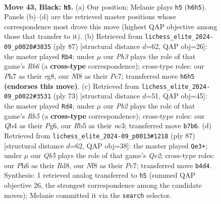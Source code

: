 \documentclass[11pt]{article}
\begin{document}
\clearpage

\begin{figure}[p]\centering
\begin{subfigure}{0.46\textwidth}\centering
\resizebox{\linewidth}{!}{%
\newchessgame
\chessboard[
  setfen={R4n1k/1pQ4p/7p/1r6/1q6/6NK/8/7R b - - 4 43},
  showmover=false,
  pgfstyle=straightmove, color=movearrow, markmove={h6-h5}
]}
\caption{}
\end{subfigure}\hfill
\begin{subfigure}{0.46\textwidth}\centering
\resizebox{\linewidth}{!}{%
\newchessgame
\chessboard[
  setfen={6R1/1kpQ4/8/p1q1pN2/4P3/1r6/6PK/8 b - - 14 44},
  showmover=false,
  pgfstyle=straightmove, color=movearrow, markmove={b3-b4}
]}
\caption{}
\end{subfigure}
\\[4pt]
\begin{subfigure}{0.46\textwidth}\centering
\resizebox{\linewidth}{!}{%
\newchessgame
\chessboard[
  setfen={3Q4/2R3nk/p5p1/7p/7r/2N5/PP6/2K1R3 b - - 0 37},
  showmover=false,
  pgfstyle=straightmove, color=movearrow, markmove={h4-d4}
]}
\caption{}
\end{subfigure}\hfill
\begin{subfigure}{0.46\textwidth}\centering
\resizebox{\linewidth}{!}{%
\newchessgame
\chessboard[
  setfen={3r4/R1p1qpk1/6p1/8/2Bn4/2N5/8/2K2R2 b - - 0 44},
  showmover=false,
  pgfstyle=straightmove, color=movearrow, markmove={e7-e3}
]}
\caption{}
\end{subfigure}
\caption{\textbf{Move 43, Black: \texttt{h5}.} (a) Our position; Melanie plays \texttt{h5} (\texttt{h6h5}). Panels (b)--(d) are the retrieved master positions whose correspondence most drove this move (highest QAP objective among those that transfer to it). (b) Retrieved from \texttt{lichess\_elite\_2024-09\_p0028\#3835} (ply 87) [structural distance $d$=62, QAP obj=26]: the master played \texttt{Rb4}; under $\mu$ our \emph{Ph3} plays the role of that game's \emph{Rb6} (a \textbf{cross-type} correspondence); cross-type roles: our \emph{P}h7 as their \emph{r}g8, our \emph{N}f8 as their \emph{P}c7; transferred move \texttt{h6h5} \textbf{(endorses this move)}. (c) Retrieved from \texttt{lichess\_elite\_2024-09\_p0022\#3531} (ply 73) [structural distance $d$=51, QAP obj=45]: the master played \texttt{Rd4}; under $\mu$ our \emph{Pb2} plays the role of that game's \emph{Rh5} (a \textbf{cross-type} correspondence); cross-type roles: our \emph{Q}b4 as their \emph{P}g6, our \emph{R}b5 as their \emph{n}c3; transferred move \texttt{b7b6}. (d) Retrieved from \texttt{lichess\_elite\_2024-09\_p0013\#1218} (ply 87) [structural distance $d$=62, QAP obj=38]: the master played \texttt{Qe3+}; under $\mu$ our \emph{Qb5} plays the role of that game's \emph{Qe2}; cross-type roles: our \emph{P}h6 as their \emph{R}d8, our \emph{N}f8 as their \emph{P}c7; transferred move \texttt{b4d4}. Synthesis: 1 retrieved analog transferred to \texttt{h5} (summed QAP objective 26, the strongest correspondence among the candidate moves); Melanie committed it via the \texttt{search} selector.}
\label{fig:thought-m85}
\end{figure}
\end{document}
